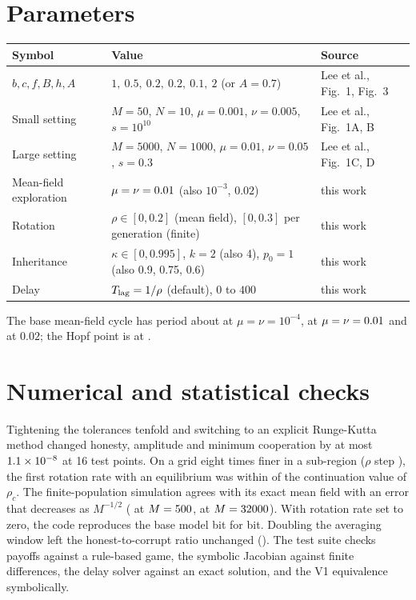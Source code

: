 \documentclass[11pt]{article}
\newcommand{\rhoc}{\rho_c}
\begin{document}
\section{Parameters}\label{app:params}

\begin{table}[h]
\centering\small
\begin{tabular}{l>{\raggedright}p{7.6cm}l}
\toprule
Symbol & Value & Source \\
\midrule
$b,c,f,B,h,A$ & $1,\ 0.5,\ 0.2,\ 0.2,\ 0.1,\ 2$ (or $A=0.7$) & Lee et al., Fig.~1, Fig.~3 \\
Small setting & $M=50$, $N=10$, $\mu=0.001$, $\nu=0.005$, $s=10^{10}$ & Lee et al., Fig.~1A, B \\
Large setting & $M=5000$, $N=1000$, $\mu=0.01$, $\nu=0.05$, $s=0.3$ & Lee et al., Fig.~1C, D \\
Mean-field exploration & $\mu=\nu=0.01$ (also $10^{-3}$, $0.02$) & this work \\
Rotation & $\rho\in[0,0.2]$ (mean field), $[0,0.3]$ per generation (finite) & this work \\
Inheritance & $\kappa\in[0,0.995]$, $k=2$ (also 4), $p_0=1$ (also 0.9, 0.75, 0.6) & this work \\
Delay & $T_{\rm lag}=1/\rho$ (default), $0$ to $400$ & this work \\
\bottomrule
\end{tabular}
\end{table}

The base mean-field cycle has period about \PerSlow{} at $\mu=\nu=10^{-4}$, \PerZero{} at
$\mu=\nu=0.01$ and \PerViolet{} at $0.02$; the Hopf point is at \HopfMuA.

\section{Numerical and statistical checks}\label{app:checks}

Tightening the tolerances tenfold and switching to an explicit Runge-Kutta method changed honesty,
amplitude and minimum cooperation by at most $1.1\times 10^{-8}$ at 16 test points. On a grid eight times
finer in a sub-region ($\rho$ step \FineGridStep), the first rotation rate with an equilibrium was
within \FineGridMaxOff{} of the continuation value of $\rhoc$. The finite-population simulation
agrees with its exact mean field with an error that decreases as $M^{-1/2}$
(\ValRmsA{} at $M=500$, \ValRmsD{} at $M=32000$). With rotation rate set to zero, the code
reproduces the base model bit for bit. Doubling the averaging window left the honest-to-corrupt
ratio unchanged (\BthreeDouble). The test suite checks payoffs against a rule-based game, the
symbolic Jacobian against finite differences, the delay solver against an exact solution, and the
V1 equivalence symbolically.
\end{document}
